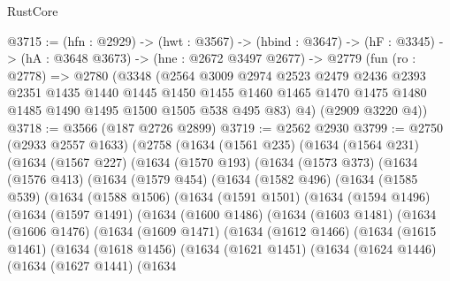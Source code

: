 \begin{lexlean}{RustCore}
\begin{coremodule}
@3715 := (hfn : @2929) ->
  (hwt : @3567) ->
  (hbind : @3647) ->
  (hF : @3345) ->
  (hA : @3648 @3673) ->
  (hne : @2672 @3497 @2677) ->
  @2779
    (fun (ro : @2778) =>
    @2780
      (@3348
        (@2564
          @3009
          @2974
          @2523
          @2479
          @2436
          @2393
          @2351
          @1435
          @1440
          @1445
          @1450
          @1455
          @1460
          @1465
          @1470
          @1475
          @1480
          @1485
          @1490
          @1495
          @1500
          @1505
          @538
          @495
          @83)
        @4)
      (@2909 @3220 @4))
@3718 := @3566 (@187 @2726 @2899)
@3719 := @2562 @2930
@3799 := @2750
    (@2933 @2557 @1633)
    (@2758
      (@1634
        (@1561 @235)
        (@1634
          (@1564 @231)
          (@1634
            (@1567 @227)
            (@1634
              (@1570 @193)
              (@1634
                (@1573 @373)
                (@1634
                  (@1576 @413)
                  (@1634
                    (@1579 @454)
                    (@1634
                      (@1582 @496)
                      (@1634
                        (@1585 @539)
                        (@1634
                          (@1588 @1506)
                          (@1634
                            (@1591 @1501)
                            (@1634
                              (@1594 @1496)
                              (@1634
                                (@1597 @1491)
                                (@1634
                                  (@1600 @1486)
                                  (@1634
                                    (@1603 @1481)
                                    (@1634
                                      (@1606 @1476)
                                      (@1634
                                        (@1609 @1471)
                                        (@1634
                                          (@1612 @1466)
                                          (@1634
                                            (@1615 @1461)
                                            (@1634
                                              (@1618 @1456)
                                              (@1634
                                                (@1621 @1451)
                                                (@1634
                                                  (@1624 @1446)
                                                  (@1634
                                                    (@1627 @1441)
                                                    (@1634

\end{coremodule}
\end{lexlean}
